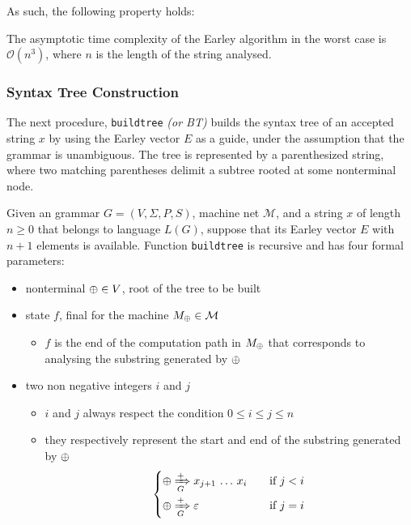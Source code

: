 \documentclass[english]{article}
\begin{document}
As such, the following property holds:

\begin{property}
  The asymptotic time complexity of the Earley algorithm in the worst case is \(\mathcal{O}(n^3)\), where \(n\) is the length of the string analysed.
\end{property}

\subsubsection{Syntax Tree Construction}

The next procedure, \texttt{buildtree} \textit{(or BT)} builds the syntax tree of an accepted string \(x\) by using the Earley vector \(E\) as a guide, under the assumption that the grammar is unambiguous.
The tree is represented by a parenthesized string, where two matching parentheses delimit a subtree rooted at some nonterminal node.

Given an \EBNF grammar \(G = \left( V, \Sigma, P, S \right)\), machine net \(\mathcal{M}\), and a string \(x\) of length \(n \geq 0\) that belongs to language \(L(G)\), suppose that its Earley vector \(E\) with \(n+1\) elements is available.
Function \texttt{buildtree} is recursive and has four formal parameters:

\begin{itemize}
  \item nonterminal \(\oplus \in V\), root of the tree to be built
  \item state \(f\), final for the machine \(M_\oplus \in \mathcal{M}\)
        \begin{itemize}[label=\(\rightarrow\)]
          \item \(f\) is the end of the computation path in \(M_\oplus\) that corresponds to analysing the substring generated by \(\oplus\)
        \end{itemize}
  \item two non negative integers \(i\) and \(j\)
        \begin{itemize}[label=\(\rightarrow\)]
          \item \(i\) and \(j\) always respect the condition \(0 \leq i \leq j \leq n\)
          \item they respectively represent the start and end of the substring generated by \(\oplus\)
                \[ \begin{cases}
                    \oplus \xRightarrow[G]{+} x_{j+1} \,\ldots\, x_i \quad & \text{if} \ j < i \\[1.5ex]
                    \oplus \xRightarrow[G]{+} \varepsilon \quad            & \text{if} \ j = i \\
                  \end{cases}  \]
        \end{itemize}
\end{itemize}
\end{document}
